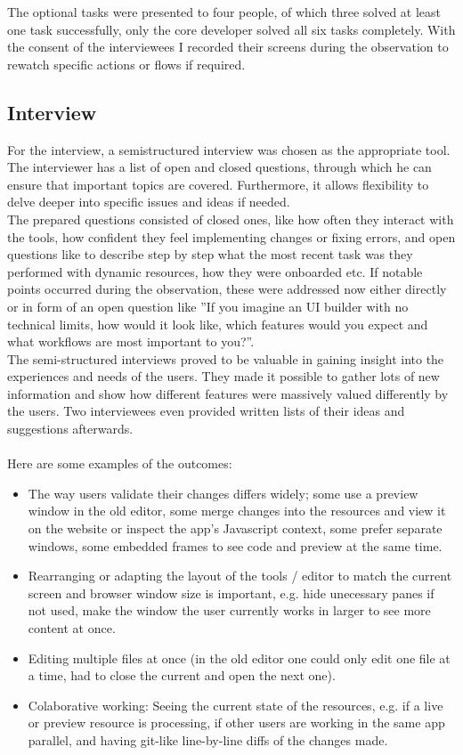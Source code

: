 The optional tasks were presented to four people, of which three solved at least one task successfully, only the core developer solved all six tasks completely.
With the consent of the interviewees I recorded their screens during the observation to rewatch specific actions or flows if required.

\subsection{Interview}
\label{subsec:interview}
For the interview, a semistructured interview was chosen as the appropriate tool.
The interviewer has a list of open and closed questions, through which he can ensure that important topics are covered.
Furthermore, it allows flexibility to delve deeper into specific issues and ideas if needed.
\\
The prepared questions consisted of closed ones, like how often they interact with the tools, how confident they feel implementing changes or fixing errors, and open questions like to describe step by step what the most recent task was they performed with dynamic resources, how they were onboarded etc.
If notable points occurred during the observation, these were addressed now either directly or in form of an open question like ''If you imagine an UI builder with no technical limits, how would it look like, which features would you expect and what workflows are most important to you?''.
\\
The semi-structured interviews proved to be valuable in gaining insight into the experiences and needs of the users. They made it possible to gather lots of new information and show how different features were massively valued differently by the users. Two interviewees even provided written lists of their ideas and suggestions afterwards.
\\\\
Here are some examples of the outcomes:
\begin{itemize}
  \item The way users validate their changes differs widely; some use a preview window in the old editor, some merge changes into the resources and view it on the website or inspect the app's Javascript context, some prefer separate windows, some embedded frames to see code and preview at the same time.
  \item Rearranging or adapting the layout of the tools / editor to match the current screen and browser window size is important, e.g. hide unecessary panes if not used, make the window the user currently works in larger to see more content at once.
  \item Editing multiple files at once (in the old editor one could only edit one file at a time, had to close the current and open the next one).
  \item Colaborative working: Seeing the current state of the resources, e.g. if a live or preview resource is processing, if other users are working in the same app parallel, and having git-like line-by-line diffs of the changes made.
\end{itemize}

